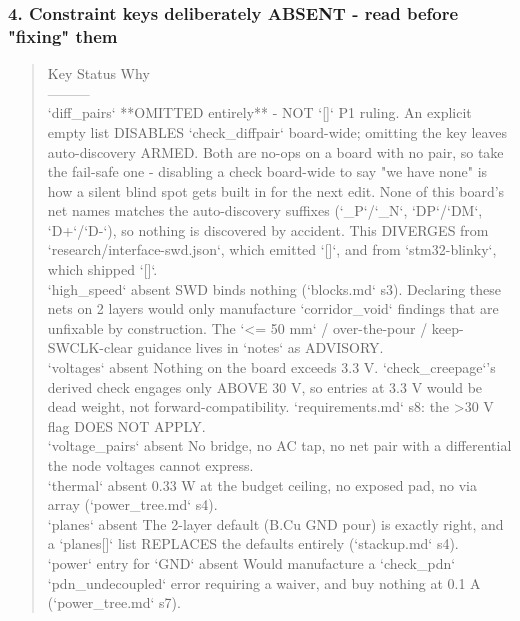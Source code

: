 \documentclass[11pt,a4paper]{article}
\begin{document}
\subsubsection*{4. Constraint keys deliberately ABSENT - read before "fixing" them}
\begin{quote}\small\ttfamily\raggedright
\textbar{} Key \textbar{} Status \textbar{} Why \textbar{}\\
\textbar{}---\textbar{}---\textbar{}---\textbar{}\\
\textbar{} `diff\_pairs` \textbar{} {*}{*}OMITTED entirely{*}{*} - NOT `{[}{]}` \textbar{} P1 ruling. An explicit empty list DISABLES `check\_diffpair` board-wide; omitting the key leaves auto-discovery ARMED. Both are no-ops on a board with no pair, so take the fail-safe one - disabling a check board-wide to say "we have none" is how a silent blind spot gets built in for the next edit. None of this board's net names matches the auto-discovery suffixes (`\_P`/`\_N`, `DP`/`DM`, `D+`/`D-`), so nothing is discovered by accident. This DIVERGES from `research/interface-swd.json`, which emitted `{[}{]}`, and from `stm32-blinky`, which shipped `{[}{]}`. \textbar{}\\
\textbar{} `high\_speed` \textbar{} absent \textbar{} SWD binds nothing (`blocks.md` s3). Declaring these nets on 2 layers would only manufacture `corridor\_void` findings that are unfixable by construction. The `\textless{}= 50 mm` / over-the-pour / keep-SWCLK-clear guidance lives in `notes` as ADVISORY. \textbar{}\\
\textbar{} `voltages` \textbar{} absent \textbar{} Nothing on the board exceeds 3.3 V. `check\_creepage`'s derived check engages only ABOVE 30 V, so entries at 3.3 V would be dead weight, not forward-compatibility. `requirements.md` s8: the \textgreater{}30 V flag DOES NOT APPLY. \textbar{}\\
\textbar{} `voltage\_pairs` \textbar{} absent \textbar{} No bridge, no AC tap, no net pair with a differential the node voltages cannot express. \textbar{}\\
\textbar{} `thermal` \textbar{} absent \textbar{} 0.33 W at the budget ceiling, no exposed pad, no via array (`power\_tree.md` s4). \textbar{}\\
\textbar{} `planes` \textbar{} absent \textbar{} The 2-layer default (B.Cu GND pour) is exactly right, and a `planes{[}{]}` list REPLACES the defaults entirely (`stackup.md` s4). \textbar{}\\
\textbar{} `power` entry for `GND` \textbar{} absent \textbar{} Would manufacture a `check\_pdn` `pdn\_undecoupled` error requiring a waiver, and buy nothing at 0.1 A (`power\_tree.md` s7). \textbar{}\\

\end{quote}
\end{document}

